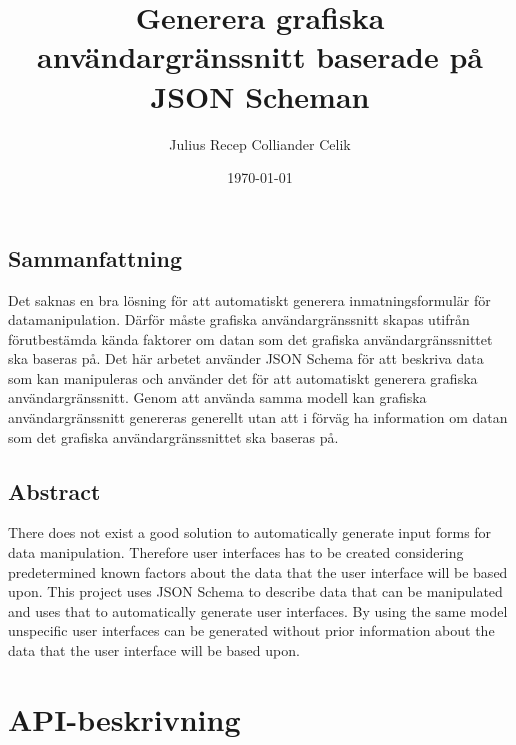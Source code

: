 \documentclass[10pt,a4paper,titlepage,twoside]{report}
\begin{document}
\title{Generera grafiska användargränssnitt baserade på JSON Scheman}
\author{Julius Recep Colliander Celik}
\date{\today}

\frontmatter


\maketitle
\cleardoublepage

\section*{Sammanfattning}
Det saknas en bra lösning för att automatiskt generera inmatningsformulär för datamanipulation. Därför måste grafiska användargränssnitt skapas utifrån förutbestämda kända faktorer om datan som det grafiska användargränssnittet ska baseras på. Det här arbetet använder JSON Schema för att beskriva data som kan manipuleras och använder det för att automatiskt generera grafiska användargränssnitt. Genom att använda samma modell kan grafiska användargränssnitt genereras generellt utan att i förväg ha information om datan som det grafiska användargränssnittet ska baseras på.
\clearpage

\section*{Abstract}
There does not exist a good solution to automatically generate input forms for data manipulation. Therefore user interfaces has to be created considering predetermined known factors about the data that the user interface will be based upon. This project uses JSON Schema to describe data that can be manipulated and uses that to automatically generate user interfaces. By using the same model unspecific user interfaces can be generated without prior information about the data that the user interface will be based upon.
\clearpage

\tableofcontents

\setlength{\parskip}{\baselineskip}
\setlength{\parindent}{0pt}

\mainmatter








\printbibliography[heading=bibintoc] %

\appendix

\chapter{API-beskrivning}
\label{appendix:api-beskrivning}
\end{document}
